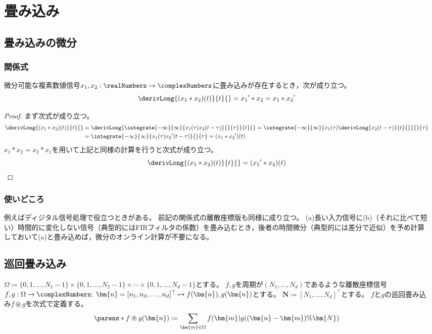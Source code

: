 \part{畳み込み}
    \chapter{畳み込みの微分}
        \section{関係式}
            \begin{shadebox}
                微分可能な複素数値信号$x_1, x_2:\realNumbers\to\complexNumbers$に畳み込みが存在するとき，次が成り立つ。
                \[ \derivLong{(x_1*x_2)(t)}{t}{} = {x_1}'*x_2 = x_1*{x_2}' \]
            \end{shadebox}
            \begin{proof}
                まず次式が成り立つ。
                \begin{align*}
                    \derivLong{(x_1*x_2)(t)}{t}{} &= \derivLong{\integrate{-\infty}{\infty}{x_1(\tau)x_2(t-\tau)}{}{\tau}}{t}{} = \integrate{-\infty}{\infty}{x_1(\tau)\derivLong{x_2(t-\tau)}{t}{}}{}{\tau} \\
                    &= \integrate{-\infty}{\infty}{x_1(\tau){x_2}'(t-\tau)}{}{\tau} = (x_1*{x_2}')(t)
                \end{align*}
                $x_1*x_2 = x_2*x_1$を用いて上記と同様の計算を行うと次式が成り立つ。
                \[ \derivLong{(x_1*x_2)(t)}{t}{} = ({x_1}'*x_2)(t) \]
            \end{proof}
        \section{使いどころ}
            例えばディジタル信号処理で役立つときがある。
            前記の関係式の離散座標版も同様に成り立つ。
            (a)長い入力信号に(b)（それに比べて短い）時間的に変化しない信号（典型的にはFIRフィルタの係数）を畳み込むとき，後者の時間微分（典型的には差分で近似）を予め計算しておいて(a)と畳み込めば，微分のオンライン計算が不要になる。
    \chapter{巡回畳み込み}
        \label{巡回畳み込み}
        $\Omega \coloneq \{0,1,\dots,N_1-1\}\times\{0,1,\dots,N_2-1\}\times\cdots\times\{0,1,\dots,N_d-1\}$とする。
        $f,g$を周期が$(N_1,\dots,N_d)$であるような離散座標信号$f,g: \Omega\to\complexNumbers;\;\bm{n} = [n_1,n_2,\dots,n_d]^\top \mapsto f(\bm{n}),g(\bm{n})$とする。
        $\bm{N} \coloneq [N_1,\dots,N_d]^\top$とする。
        $f$と$g$の巡回畳み込み$f\circledast g$を次式で定義する。
        \[ \parens*{f\circledast g}(\bm{n}) \coloneq \sum_{\bm{m} \in\Omega} f(\bm{m})g((\bm{n}-\bm{m})\%\bm{N}) \]

